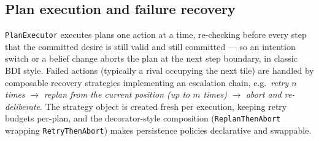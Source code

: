\subsection{Plan execution and failure recovery}
\texttt{PlanExecutor} executes plans one action at a time, re-checking before every step that
the committed desire is still valid and still committed --- so an intention switch or a belief
change aborts the plan at the next step boundary, in classic BDI style. Failed actions
(typically a rival occupying the next tile) are handled by composable recovery strategies
implementing an escalation chain, e.g.\ \emph{retry $n$ times} $\rightarrow$ \emph{replan from
the current position (up to $m$ times)} $\rightarrow$ \emph{abort and re-deliberate}. The
strategy object is created fresh per execution, keeping retry budgets per-plan, and the
decorator-style composition (\texttt{ReplanThenAbort} wrapping \texttt{RetryThenAbort}) makes
persistence policies declarative and swappable.
